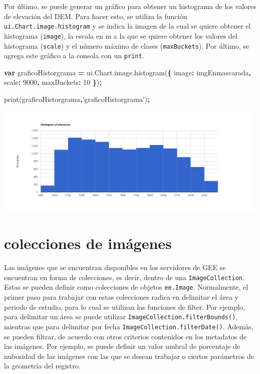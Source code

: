 \documentclass[
]{article}
\newenvironment{Shaded}{\begin{snugshade}}{\end{snugshade}}
\newcommand{\AttributeTok}[1]{\textcolor[rgb]{0.77,0.63,0.00}{#1}}
\newcommand{\DataTypeTok}[1]{\textcolor[rgb]{0.13,0.29,0.53}{#1}}
\newcommand{\DecValTok}[1]{\textcolor[rgb]{0.00,0.00,0.81}{#1}}
\newcommand{\KeywordTok}[1]{\textcolor[rgb]{0.13,0.29,0.53}{\textbf{#1}}}
\newcommand{\NormalTok}[1]{#1}
\newcommand{\OperatorTok}[1]{\textcolor[rgb]{0.81,0.36,0.00}{\textbf{#1}}}
\newcommand{\StringTok}[1]{\textcolor[rgb]{0.31,0.60,0.02}{#1}}
\newcommand{\VariableTok}[1]{\textcolor[rgb]{0.00,0.00,0.00}{#1}}
\begin{document}
Por último, se puede generar un gráfico para obtener un histograma de
los valores de elevación del DEM. Para hacer esto, se utiliza la función
\texttt{ui.Chart.image.histogram} y se indica la imagen de la cual se
quiere obtener el histograma (\texttt{image}), la escala en m a la que
se quiere obtener los valores del histograma (\texttt{scale}) y el
número máximo de clases (\texttt{maxBuckets}). Por último, se agrega
este gráfico a la consola con un \texttt{print}.

\begin{Shaded}
\begin{Highlighting}[]
\KeywordTok{var}\NormalTok{ graficoHistorgrama }\OperatorTok{=} \VariableTok{ui}\NormalTok{.}\VariableTok{Chart}\NormalTok{.}\VariableTok{image}\NormalTok{.}\AttributeTok{histogram}\NormalTok{(}\OperatorTok{\{}
  \DataTypeTok{image}\OperatorTok{:}\NormalTok{ imgEnmascarada}\OperatorTok{,}
  \DataTypeTok{scale}\OperatorTok{:} \DecValTok{9000}\OperatorTok{,}
  \DataTypeTok{maxBuckets}\OperatorTok{:} \DecValTok{10}
  \OperatorTok{\}}\NormalTok{)}\OperatorTok{;}

\AttributeTok{print}\NormalTok{(graficoHistorgrama}\OperatorTok{,}\StringTok{'graficoHistorgrama'}\NormalTok{)}\OperatorTok{;}
\end{Highlighting}
\end{Shaded}

\includegraphics[width=500px]{Img/histElevacion}

\newpage

\hypertarget{colecciones-de-imuxe1genes}{%
\section{colecciones de imágenes}\label{colecciones-de-imuxe1genes}}

Las imágenes que se encuentran disponibles en los servidores de GEE se
encuentran en forma de colecciones, es decir, dentro de una
\texttt{ImageCollection}. Estas se pueden definir como colecciones de
objetos \texttt{ee.Image}. Normalmente, el primer paso para trabajar con
estas colecciones radica en delimitar el área y periodo de estudio, para
lo cual se utilizan las funciones de filter. Por ejemplo, para delimitar
un área se puede utilizar \texttt{ImageCollection.filterBounds()},
mientras que para delimitar por fecha
\texttt{ImageCollection.filterDate()}. Además, se pueden filtrar, de
acuerdo con otros criterios contenidos en los metadatos de las imágenes.
Por ejemplo, se puede definir un valor umbral de porcentaje de nubosidad
de las imágenes con las que se desean trabajar o ciertos parámetros de
la geometría del registro.
\end{document}
